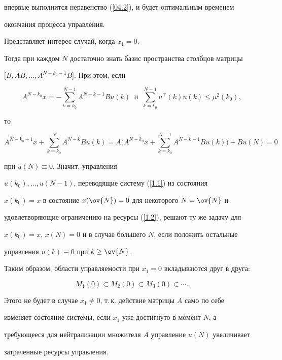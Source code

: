 впервые выполнится неравенство (\ref{04.2}), и будет оптимальным временем


окончания процесса управления.





\begin{notes}


Представляет интерес случай, когда $x_1=0$.


Тогда при каждом $N$ достаточно знать базис пространства столбцов матрицы


$\bigl[B, AB,\dotsc, A^{N-k_0-1}B\bigr]$. При этом, если


$$


A^{N-k_0}x=-\sum_{k=k_0}^{N-1}A^{N-k-1}Bu(k) \ \text{\ и \ } \


\sum_{k=k_0}^{N-1}u^{\top}(k)u(k)\le\mu^2(k_0),


$$


то


$$


A^{N-k_0+1}x+\sum_{k=k_0}^N


A^{N-k}Bu(k)=A\bigg(A^{N-k_0}x+\sum_{k=k_0}^{N-1}A^{N-k-1}


Bu(k)\bigg)+Bu(N)=0


$$


при $u(N)\equiv 0$. Значит, управления


$u(k_0),\dotsc, u(N-1)$, переводящие систему (\ref{1.1}) из состояния


$x(k_0)=x$ в состояние $x(\ov{N})=0$ для некоторого $N=\ov{N}$ и


удовлетворяющие ограничению на ресурсы (\ref{1.2}), решают ту же задачу для


$x(k_0)=x$, $x(N)=0$ и в случае большего $N$, если положить остальные


управления $u(k)\equiv 0$ при $k\ge \ov{N}$.





Таким образом, области управляемости при $x_1=0$ вкладываются друг в друга:


$$


M_1(0)\subset M_2(0)\subset M_3(0)\subset\dotsb.


$$


Этого не будет в случае $x_1\ne 0$, т.\,к. действие матрицы $A$ само по себе


изменяет состояние системы, если $x_1$ уже достигнуто в момент $N$, а


требующееся для нейтрализации множителя $A$ управление $u(N)$ увеличивает


затраченные ресурсы управления.


\end{notes}





